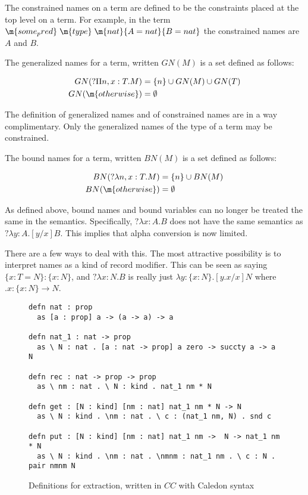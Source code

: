 The constrained names on a term are defined to be the constraints placed at the top level on 
a term.  For example, in the term $\m{some_pred} \; \m{type} \; \m{nat} \{ A = nat \} \{ B = nat \}$ the constrained names are $A$ and $B$.  

\begin{definition}
The generalized names for a term, written $GN(M)$ is a set defined as follows:

\begin{align}
GN(?\Pi n,x : T . M) &= \{ n \} \cup GN(M) \cup GN(T)
\\
GN(\m{otherwise}) &= \emptyset
\end{align}
\end{definition}

The definition of generalized names and of constrained names are in a way complimentary.
Only the generalized names of the type of a term may be constrained.

\begin{definition}
The bound names for a term, written $BN(M)$ is a set defined as follows:

\begin{align} 
BN(?\lambda n,x : T . M) &= \{ n \} \cup BN(M)
\\
BN(\m{otherwise}) &= \emptyset
\end{align}

\end{definition}

As defined above, bound names and bound variables can no longer be treated the same in the semantics.  
Specifically, $?\lambda x : A . B$ does not have the same semantics as $?\lambda y : A . [y / x] B$.  
This implies that alpha conversion is now limited.  

There are a few ways to deal with this.  
The most attractive possibility is to interpret names as a kind of record modifier.
This can be seen as saying $\{ x : T = N \} : \{ x : N \}$, 
and $?\lambda x : N . B$ is really just $\lambda y : \{ x : N \} . [ y.x / x ] N$ where $ .x : \{ x : N \} \rightarrow N$.

\begin{figure}[H]
\begin{lstlisting}
defn nat : prop 
  as [a : prop] a -> (a -> a) -> a

defn nat_1 : nat -> prop
  as \ N : nat . [a : nat -> prop] a zero -> succty a -> a N

defn rec : nat -> prop -> prop
  as \ nm : nat . \ N : kind . nat_1 nm * N

defn get : [N : kind] [nm : nat] nat_1 nm * N -> N
  as \ N : kind . \nm : nat . \ c : (nat_1 nm, N) . snd c

defn put : [N : kind] [nm : nat] nat_1 nm ->  N -> nat_1 nm * N
  as \ N : kind . \nm : nat . \nmnm : nat_1 nm . \ c : N . pair nmnm N
\end{lstlisting}
\caption{Definitions for extraction, written in $CC$ with Caledon syntax}
\label{code:ideal}
\end{figure}

